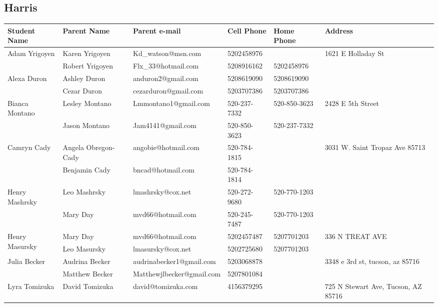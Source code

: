 \documentclass[landscape]{article}\usepackage[]{graphicx}\usepackage[]{color}
\begin{document}
\subsection{Harris}
\begin{longtable}{|p{100pt}|p{100pt}|p{140pt}|p{60pt}|p{64pt}|p{120pt}|}
\textbf{Student Name} & \textbf{Parent Name} & \textbf{Parent e-mail} & \textbf{Cell Phone} & \textbf{Home Phone} & \textbf{Address}\\
\hline
\hline
\multirow{2}{100pt}{Adam Yrigoyen} & Karen Yrigoyen  & Kd\_watson@msn.com & 5202458976 &  & \multirow{2}{120pt}{1621 E Holladay St} \\
 & Robert Yrigoyen & Flx\_33@hotmail.com  & 5208916162 & 5202458976 & \\
\hline
\multirow{2}{100pt}{Alexa Duron} & Ashley Duron & anduron2@gmail.com & 5208619090 & 5208619090 & \multirow{2}{120pt}{} \\
 & Cezar Duron & cezarduron@gmail.com & 5203707386 & 5203707386 & \\
\hline
\multirow{2}{100pt}{Bianca Montano} & Lesley Montano & Lmmontano1@gmail.com & 520-237-7332 & 520-850-3623 & \multirow{2}{120pt}{2428 E 5th Street} \\
 & Jason Montano & Jam4141@gmail.com & 520-850-3623 & 520-237-7332 & \\
\hline
\multirow{2}{100pt}{Camryn Cady} & Angela Obregon-Cady & angobie@hotmail.com & 520-784-1815 &  & \multirow{2}{120pt}{3031 W. Saint Tropaz Ave 85713} \\
 & Benjamin Cady & bncad@hotmail.com & 520-784-1814 &  & \\
\hline
\multirow{2}{100pt}{Henry Mashrsky} & Leo Mashrsky & lmashrsky@cox.net & 520-272-9680 & 520-770-1203 & \multirow{2}{120pt}{} \\
 & Mary Day & mvd66@hotmail.com & 520-245-7487 & 520-770-1203 & \\
\hline
\multirow{2}{100pt}{Henry Masursky} & Mary Day & mvd66@hotmail.com & 5202457487 & 5207701203 & \multirow{2}{120pt}{336 N TREAT AVE} \\
 & Leo Masursky & lmasursky@cox.net & 5202725680 & 5207701203 & \\
\hline
\multirow{2}{100pt}{Julia Becker} & Audrina Becker & audrinabecker1@gmail.com & 5203068878 &  & \multirow{2}{120pt}{3348 e 3rd st, tucson, az 85716} \\
 & Matthew Becker & Matthewjlbecker@gmail.com & 5207801084 &  & \\
\hline
\multirow{2}{100pt}{Lyra Tomizuka} & David Tomizuka & david@tomizuka.com & 4156379295 &  & \multirow{2}{120pt}{725 N Stewart Ave, Tucson, AZ 85716} \\

\end{longtable}
\end{document}
